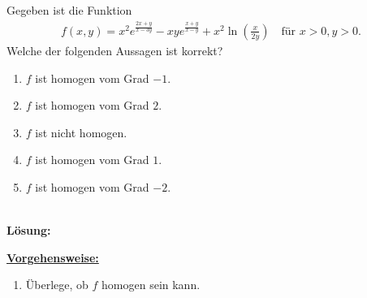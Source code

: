 \newpage

\subsection*{}
Gegeben ist die Funktion
\begin{align*}
	f(x,y) 
	=
	x^2 e^{\frac{ 2x+y}{x - 3y }}
	-
	xy e^{\frac{x+y}{x-y}}
	+
	x^2 \ln \left( \frac{x }{2y} \right)
	\quad \textrm{für } x>0,y>0.
\end{align*}
Welche der folgenden Aussagen ist korrekt?
\renewcommand{\labelenumi}{(\alph{enumi})}
\begin{enumerate}
	\item
	$ f  $ ist homogen vom Grad $ -1 $.
	\item
	$ f  $ ist homogen vom Grad $ 2 $.
	\item
	$f $ ist nicht homogen.
	\item 
	$ f  $ ist homogen vom Grad $ 1$.
	\item
	$ f  $ ist homogen vom Grad $ -2 $.
\end{enumerate}\ \\
\textbf{Lösung:}
\begin{mdframed}
\underline{\textbf{Vorgehensweise:}}
\renewcommand{\labelenumi}{\theenumi.}
\begin{enumerate}
\item Überlege, ob $ f $ homogen sein kann.
\end{enumerate}
\end{mdframed}

